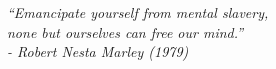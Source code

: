 \begin{epigrafe}
    \vspace*{\fill}
	\begin{flushright}
		\textit{
		``Emancipate yourself from mental slavery,\\
		 none but ourselves can free our mind.''\\
		\-- Robert Nesta Marley (1979)	
		}
	\end{flushright}
\end{epigrafe}
